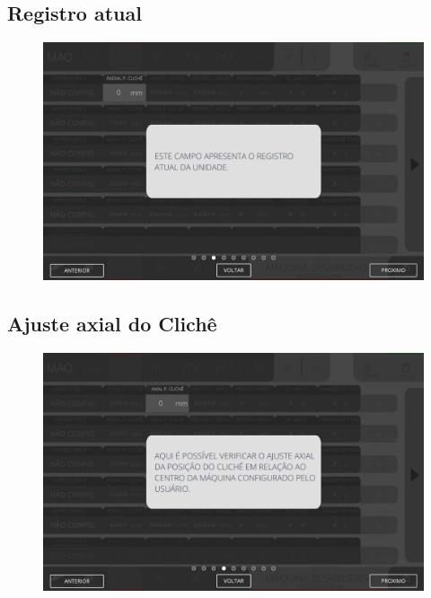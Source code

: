 \newpage
\thispagestyle{fancy}
\vspace*{40 pt}
\subsection{Registro atual}
\vspace*{\fill}
\begin{figure}[h]
    \centering
    \includegraphics[width=576 px,height=360 px]{src/imagesICV/04-printters/01-printters/settings/3.png}
\end{figure}
\vspace*{\fill}

\newpage
\thispagestyle{fancy}
\vspace*{40 pt}
\subsection{Ajuste axial do Clichê}
\vspace*{\fill}
\begin{figure}[h]
    \centering
    \includegraphics[width=576 px,height=360 px]{src/imagesICV/04-printters/01-printters/settings/4.png}
\end{figure}
\vspace*{\fill}

